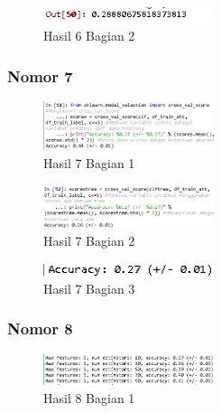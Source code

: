 
\begin{figure}[H]
\centerline{\includegraphics[width=5cm]{figures/1174079/3/praktek27.PNG}}
\caption{Hasil 6 Bagian 2}
\label{labelgambar}
\end{figure}

\subsubsection{Nomor 7}
\hfill\break

\begin{figure}[H]
\centerline{\includegraphics[width=5cm]{figures/1174079/3/praktek28.PNG}}
\caption{Hasil 7 Bagian 1}
\label{labelgambar}
\end{figure}


\begin{figure}[H]
\centerline{\includegraphics[width=5cm]{figures/1174079/3/praktek29.PNG}}
\caption{Hasil 7 Bagian 2}
\label{labelgambar}
\end{figure}


\begin{figure}[H]
\centerline{\includegraphics[width=5cm]{figures/1174079/3/praktek30.PNG}}
\caption{Hasil 7 Bagian 3}
\label{labelgambar}
\end{figure}

\subsubsection{Nomor 8}
\hfill\break

\begin{figure}[H]
\centerline{\includegraphics[width=5cm]{figures/1174079/3/praktek31.PNG}}
\caption{Hasil 8 Bagian 1}
\label{labelgambar}
\end{figure}

